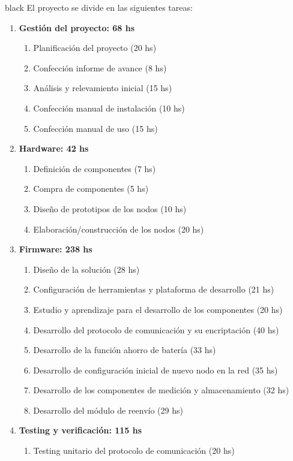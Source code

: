 \documentclass[11pt]{charter}
\begin{document}
\begin{consigna}{black}
El proyecto se divide en las siguientes tareas:

\begin{enumerate}
\item \textbf{Gestión del proyecto: 68 hs}
	\begin{enumerate}
	\item Planificación del proyecto (20 hs)
	\item Confección informe de avance (8 hs)
	\item Análisis y relevamiento inicial (15 hs)
	\item Confección manual de instalación (10 hs)
	\item Confección manual de uso (15 hs)
	\end{enumerate}
\item \textbf{Hardware: 42 hs}
	\begin{enumerate}
	\item Definición de componentes (7 hs)
	\item Compra de componentes (5 hs)
	\item Diseño de prototipos de los nodos (10 hs)
	\item Elaboración/construcción de los nodos (20 hs)
	\end{enumerate}
\item \textbf{Firmware: 238 hs}
	\begin{enumerate}
	\item Diseño de la solución (28 hs)
	\item Configuración de herramientas y plataforma de desarrollo (21 hs)
	\item Estudio y aprendizaje para el desarrollo de los componentes (20 hs)
	\item Desarrollo del protocolo de comunicación y su encriptación (40 hs)
	\item Desarrollo de la función ahorro de batería (33 hs)
	\item Desarrollo de configuración inicial de nuevo nodo en la red (35 hs)
	\item Desarrollo de los componentes de medición y almacenamiento (32 hs)
	\item Desarrollo del módulo de reenvío (29 hs)
	\end{enumerate}
\item \textbf{Testing y verificación: 115 hs}
	\begin{enumerate}
	\item Testing unitario del protocolo de comunicación (20 hs)

\end{enumerate}
\end{enumerate}
\end{consigna}
\end{document}
